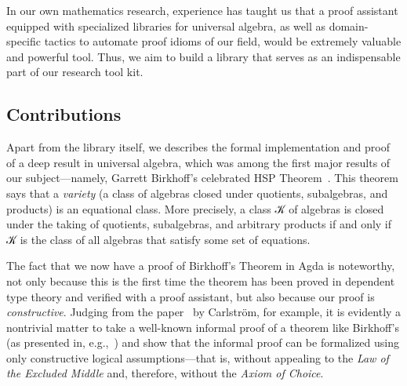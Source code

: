 In our own mathematics research, experience has taught us that a proof assistant equipped with specialized libraries for universal algebra, as well as domain-specific tactics to automate proof idioms of our field, would be extremely valuable and powerful tool. Thus, we aim to build a library that serves as an indispensable part of our research tool kit.



\subsection{Contributions}
\label{sec:contributions}
Apart from the library itself, we describes the formal implementation and proof of a deep result in universal algebra, which was among the first major results of our subject---namely, Garrett Birkhoff's celebrated HSP Theorem~\cite{Birkhoff:1935}.  This theorem says that a \textit{variety} (a class of algebras closed under quotients, subalgebras, and products) is an equational class.  More precisely, a class 𝒦 of algebras is closed under the taking of quotients, subalgebras, and arbitrary products if and only if 𝒦 is the class of all algebras that satisfy some set of equations.

The fact that we now have a proof of Birkhoff's Theorem in Agda is noteworthy, not only because this is the first time the theorem has been proved in dependent type theory and verified with a proof assistant, but also because our proof is \emph{constructive}. Judging from the paper~\cite{Carlstrom:2008} by Carlstr\"om, for example, it is evidently a nontrivial matter to take a well-known informal proof of a theorem like Birkhoff's (as presented in, e.g.,~\cite{Bergman:2012}) and show that the informal proof can be formalized using only constructive logical assumptions---that is, without appealing to the \textit{Law of the Excluded Middle} and, therefore, without the \textit{Axiom of Choice}.

